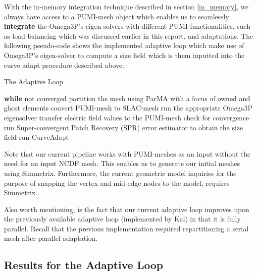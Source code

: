 \documentclass[review,12pt]{elsarticle_summary_report}
\begin{document}
With the in-memory integration technique described in section \ref{in_memory}, we always have access to a PUMI-mesh object which enables us to seamlessly \textbf{integrate} the Omega3P's eigen-solvers with different PUMI functionalities, such as load-balancing which was discussed earlier in this report, and adaptations. The following pseudo-code shows the implemented adaptive loop which make use of Omega3P's eigen-solver to compute a size field which is them inputted into the curve adapt procedure described above.

\begin{algorithm}
\caption{The Adaptive Loop}\label{adapt_loop}
\begin{algorithmic}[1]
\State \textbf{while} not converged
\State \quad partition the mesh using ParMA with a focus of owned and ghost elements
\State \quad convert PUMI-mesh to SLAC-mesh
\State \quad run the appropriate Omega3P eigensolver
\State \quad transfer electric field values to the PUMI-mesh
\State \quad check for convergence
\State \quad run Super-convergent Patch Recovery (SPR) error estimator to obtain the size field
\State \quad run CurveAdapt
\end{algorithmic}
\end{algorithm}

Note that our current pipeline works with PUMI-meshes as an input without the need for an input NCDF mesh. This enables us to generate our initial meshes using Simmetrix. Furthermore, the current geometric model inquiries for the purpose of snapping the vertex and mid-edge nodes to the model, requires Simmetrix.

Also worth mentioning, is the fact that our current adaptive loop improves upon the previously available adaptive loop (implemented by Kai) in that it is fully parallel. Recall that the previous implementation required repartitioning a serial mesh after parallel adaptation.

\subsection{Results for the Adaptive Loop}

\end{document}
